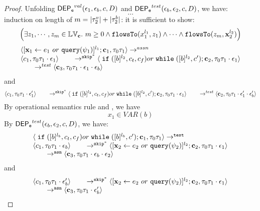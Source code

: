 \begin{proof}
Unfolding $\mathsf{DEP_{\mathtt{e}}}^{val}(\mathtt{\epsilon}_1, \mathtt{\epsilon}_b, c, D)$ and $\mathsf{DEP_{\mathtt{e}}}^{test}(\mathtt{\epsilon}_b, \mathtt{\epsilon}_2, c, D)$, we have:
\[
  \ldots
\]
induction on length of $m = |\mathtt{\tau}_2^v| + |\mathtt{\tau}_2^b|$:
it is sufficient to show:
 \[\Big( \exists z_1, \cdots, z_m \in \mathbb{LV}_{{\boldsymbol{\mathbf{c}}}}. ~ m \geq 0 \land
  \mathtt{flowsTo}(x_1^{l_1}, z_1) 
  \land \cdots \land \mathtt{flowsTo}(z_m, {\boldsymbol{\mathbf{x}}}_2^{l_2}) \Big)
  \]
\[
\begin{array}{l}
  \langle [\mathrel{ {\boldsymbol{\mathbf{x}}}_1 \leftarrow e_1~ or ~ {\tt query}(\psi_1) }]^{l_1} ; {\boldsymbol{\mathbf{c}}}_1, \mathtt{\tau}_0 \mathtt{\tau}_1 \rangle  \rightarrow^{assn}
\\ 
 \langle c_1, \mathtt{\tau}_0 \mathtt{\tau}_1 \cdot \mathtt{\epsilon}_1 \rangle 
  \qquad \rightarrow^{\mathtt{skip}^*} 
  \langle \;\mathtt{if}\;([b]^{l_2}, c_t, c_f) or \;\mathtt{while}\;([b]^{l_2}, c');{\boldsymbol{\mathbf{c}}}_2, 
  \mathtt{\tau}_0 \mathtt{\tau}_1 \cdot \mathtt{\epsilon}_1 \rangle 
  \\
  \qquad \rightarrow^{test} 
  \langle {\boldsymbol{\mathbf{c}}}_3,  \mathtt{\tau}_0 \mathtt{\tau}_1 \cdot \mathtt{\epsilon}_1 \cdot \mathtt{\epsilon}_b \rangle 
 \end{array}
\]
and
\[
   \langle c_1, \mathtt{\tau}_0 \mathtt{\tau}_1 \cdot \mathtt{\epsilon}_1' \rangle 
  \qquad \rightarrow^{\mathtt{skip}^*} 
  \langle \;\mathtt{if}\;([b]^{l_2}, c_t, c_f) or \;\mathtt{while}\;([b]^{l_2}, c');{\boldsymbol{\mathbf{c}}}_2, 
  \mathtt{\tau}_0 \mathtt{\tau}_1 \cdot \mathtt{\epsilon}_1 \rangle 
  \\
  \qquad \rightarrow^{test} 
  \langle {\boldsymbol{\mathbf{c}}}_2,  \mathtt{\tau}_0 \mathtt{\tau}_1 \cdot \mathtt{\epsilon}_1' \cdot \mathtt{\epsilon}_b' \rangle 
\]
By operational semantics rule  and , we have 
\[
  x_1 \in VAR(b)
\]
By $\mathsf{DEP_{\mathtt{e}}}^{test}(\mathtt{\epsilon}_b, \mathtt{\epsilon}_2, c, D)$, we have:
\[
\begin{array}{l}
  \langle \;\mathtt{if}\;([b]^{l_b}, c_t, c_f) or \;\mathtt{while}\;([b]^{l_b}, c'); {\boldsymbol{\mathbf{c}}}_1, \mathtt{\tau}_0 \mathtt{\tau}_1 \rangle  \rightarrow^{\mathtt{{test}}}
\\ 
 \langle c_1, \mathtt{\tau}_0 \mathtt{\tau}_1 \cdot \mathtt{\epsilon}_b \rangle 
  \qquad \rightarrow^{\mathtt{skip}^*} 
  \langle [\mathrel{ {\boldsymbol{\mathbf{x}}}_2 \leftarrow e_2 ~ or ~ {\tt query}(\psi_2) }]^{l_2};{\boldsymbol{\mathbf{c}}}_2, 
  \mathtt{\tau}_0 \mathtt{\tau}_1 \cdot \mathtt{\epsilon}_1 \rangle 
  \\
  \qquad \rightarrow^{\mathtt{{asn}}} 
  \langle {\boldsymbol{\mathbf{c}}}_3,  \mathtt{\tau}_0 \mathtt{\tau}_1 \cdot \mathtt{\epsilon}_b \cdot \mathtt{\epsilon}_2 \rangle 
 \end{array}
\]
and
\[
\begin{array}{l}
  \langle c_1, \mathtt{\tau}_0 \mathtt{\tau}_1 \cdot \mathtt{\epsilon}_b' \rangle 
  \qquad \rightarrow^{\mathtt{skip}^*} 
  \langle [\mathrel{ {\boldsymbol{\mathbf{x}}}_2 \leftarrow e_2 ~ or ~ {\tt query}(\psi_2) }]^{l_2};{\boldsymbol{\mathbf{c}}}_2, 
  \mathtt{\tau}_0 \mathtt{\tau}_1 \cdot \mathtt{\epsilon}_1 \rangle 
  \\
  \qquad \rightarrow^{\mathtt{{asn}}} 
  \langle {\boldsymbol{\mathbf{c}}}_3,  \mathtt{\tau}_0 \mathtt{\tau}_1 \cdot \mathtt{\epsilon}_b' \rangle 
 \end{array}\]

\end{proof}
